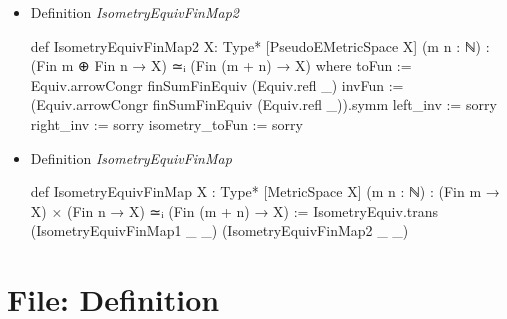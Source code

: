\documentclass[colorinlistoftodos]{article}
\begin{document}
\begin{itemize}
  \item Definition \emph{IsometryEquivFinMap2}
\begin{leancode}
def IsometryEquivFinMap2 {X: Type*} [PseudoEMetricSpace X] (m n : ℕ) :
(Fin m ⊕ Fin n → X) ≃ᵢ (Fin (m + n) → X) where
  toFun := Equiv.arrowCongr finSumFinEquiv (Equiv.refl _)
  invFun := (Equiv.arrowCongr finSumFinEquiv (Equiv.refl _)).symm
  left_inv := sorry
  right_inv := sorry
  isometry_toFun := sorry
\end{leancode}
  \item Definition \emph{IsometryEquivFinMap}
\begin{leancode}
def IsometryEquivFinMap {X : Type*} [MetricSpace X] (m n : ℕ) :
(Fin m → X) × (Fin n → X) ≃ᵢ (Fin (m + n) → X) :=
  IsometryEquiv.trans (IsometryEquivFinMap1 _ _) (IsometryEquivFinMap2 _ _)
\end{leancode}
\end{itemize}

\section{File: Definition}
\end{document}
